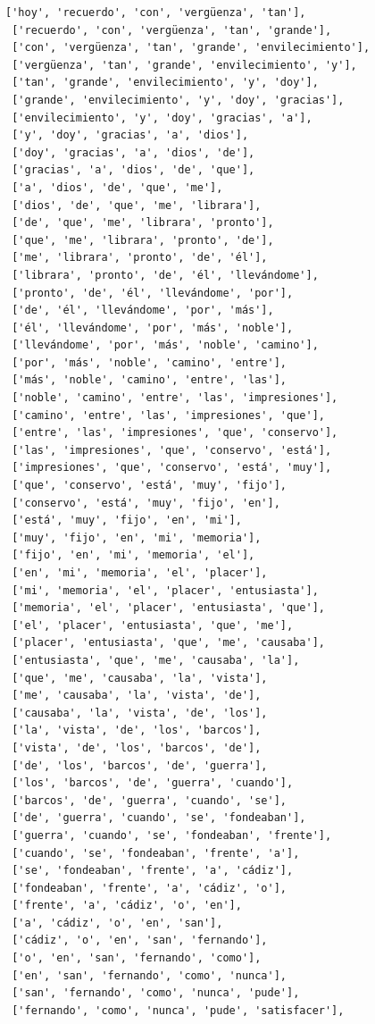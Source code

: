 \documentclass[11pt]{article}
\begin{document}
\begin{tcolorbox}[breakable, size=fbox, boxrule=1pt, pad at break*=1mm,colback=cellbackground, colframe=cellborder]
\begin{Verbatim}[commandchars=\\\{\}]
 ['hoy', 'recuerdo', 'con', 'vergüenza', 'tan'],
 ['recuerdo', 'con', 'vergüenza', 'tan', 'grande'],
 ['con', 'vergüenza', 'tan', 'grande', 'envilecimiento'],
 ['vergüenza', 'tan', 'grande', 'envilecimiento', 'y'],
 ['tan', 'grande', 'envilecimiento', 'y', 'doy'],
 ['grande', 'envilecimiento', 'y', 'doy', 'gracias'],
 ['envilecimiento', 'y', 'doy', 'gracias', 'a'],
 ['y', 'doy', 'gracias', 'a', 'dios'],
 ['doy', 'gracias', 'a', 'dios', 'de'],
 ['gracias', 'a', 'dios', 'de', 'que'],
 ['a', 'dios', 'de', 'que', 'me'],
 ['dios', 'de', 'que', 'me', 'librara'],
 ['de', 'que', 'me', 'librara', 'pronto'],
 ['que', 'me', 'librara', 'pronto', 'de'],
 ['me', 'librara', 'pronto', 'de', 'él'],
 ['librara', 'pronto', 'de', 'él', 'llevándome'],
 ['pronto', 'de', 'él', 'llevándome', 'por'],
 ['de', 'él', 'llevándome', 'por', 'más'],
 ['él', 'llevándome', 'por', 'más', 'noble'],
 ['llevándome', 'por', 'más', 'noble', 'camino'],
 ['por', 'más', 'noble', 'camino', 'entre'],
 ['más', 'noble', 'camino', 'entre', 'las'],
 ['noble', 'camino', 'entre', 'las', 'impresiones'],
 ['camino', 'entre', 'las', 'impresiones', 'que'],
 ['entre', 'las', 'impresiones', 'que', 'conservo'],
 ['las', 'impresiones', 'que', 'conservo', 'está'],
 ['impresiones', 'que', 'conservo', 'está', 'muy'],
 ['que', 'conservo', 'está', 'muy', 'fijo'],
 ['conservo', 'está', 'muy', 'fijo', 'en'],
 ['está', 'muy', 'fijo', 'en', 'mi'],
 ['muy', 'fijo', 'en', 'mi', 'memoria'],
 ['fijo', 'en', 'mi', 'memoria', 'el'],
 ['en', 'mi', 'memoria', 'el', 'placer'],
 ['mi', 'memoria', 'el', 'placer', 'entusiasta'],
 ['memoria', 'el', 'placer', 'entusiasta', 'que'],
 ['el', 'placer', 'entusiasta', 'que', 'me'],
 ['placer', 'entusiasta', 'que', 'me', 'causaba'],
 ['entusiasta', 'que', 'me', 'causaba', 'la'],
 ['que', 'me', 'causaba', 'la', 'vista'],
 ['me', 'causaba', 'la', 'vista', 'de'],
 ['causaba', 'la', 'vista', 'de', 'los'],
 ['la', 'vista', 'de', 'los', 'barcos'],
 ['vista', 'de', 'los', 'barcos', 'de'],
 ['de', 'los', 'barcos', 'de', 'guerra'],
 ['los', 'barcos', 'de', 'guerra', 'cuando'],
 ['barcos', 'de', 'guerra', 'cuando', 'se'],
 ['de', 'guerra', 'cuando', 'se', 'fondeaban'],
 ['guerra', 'cuando', 'se', 'fondeaban', 'frente'],
 ['cuando', 'se', 'fondeaban', 'frente', 'a'],
 ['se', 'fondeaban', 'frente', 'a', 'cádiz'],
 ['fondeaban', 'frente', 'a', 'cádiz', 'o'],
 ['frente', 'a', 'cádiz', 'o', 'en'],
 ['a', 'cádiz', 'o', 'en', 'san'],
 ['cádiz', 'o', 'en', 'san', 'fernando'],
 ['o', 'en', 'san', 'fernando', 'como'],
 ['en', 'san', 'fernando', 'como', 'nunca'],
 ['san', 'fernando', 'como', 'nunca', 'pude'],
 ['fernando', 'como', 'nunca', 'pude', 'satisfacer'],

\end{Verbatim}
\end{tcolorbox}
\end{document}
